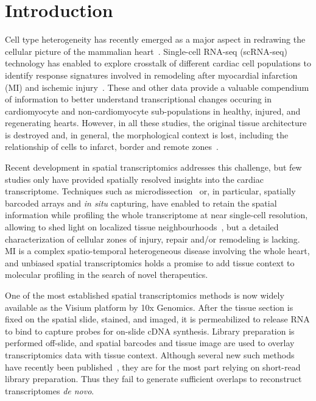 \documentclass[utf8]{FrontiersinHarvard} %
\newcommand{\insi}{\textit{in situ}\xspace}
\newcommand{\denovo}{\textit{de novo}\xspace}
\begin{document}
\section*{Introduction}
Cell type heterogeneity has recently emerged as a major aspect in redrawing the cellular picture of the mammalian heart~\citep{Wang2020:human_heart,Tucker2020:human_heart,Litvinukova2020:human_heart}. 
Single-cell RNA-seq (scRNA-seq) technology has enabled to explore crosstalk of different cardiac cell populations to identify response signatures involved in remodeling after myocardial infarction (MI) and ischemic injury~\citep{Cui2020:regenerative_cm,Forte2020:interstitial,Ruiz-Villalba2020:CF,Vafadarnejad2020:cardiac_neutrophil,Molenaar2021:ischemic,Gladka2021:CM_ZEB2,Tombor2021:endothelial_plasticity,Heinrichs2021:B-cell}.
These and other data provide a valuable compendium of information to better understand transcriptional changes occuring in cardiomyocyte and non-cardiomyocyte sub-populations in healthy, injured, and regenerating hearts.
However, in all these studies, the original tissue architecture is destroyed and, in general, the morphological context is lost, including the relationship of cells to infarct, border and remote zones~\citep{Duijvenboden2019:border_zone}.

Recent development in spatial transcriptomics addresses this challenge, but few studies only have provided spatially resolved insights into the cardiac transcriptome.
Techniques such as microdissection~\citep{Wu2016:zebrafish_cm,Burkhard2018:embryonic_heart} or, in particular, spatially barcoded arrays and \insi capturing, have enabled to retain the spatial information while profiling the whole transcriptome at near single-cell resolution, allowing to shed light on localized tissue neighbourhoods~\citep{Asp2017:fetal_markers,Asp2019:spatial_atlas_devel_heart}, but a detailed characterization of cellular zones of injury, repair and/or remodeling is lacking. MI is a complex spatio-temporal heterogeneous disease involving the whole heart, and unbiased spatial transcriptomics holds a promise to add tissue context to molecular profiling in the search of novel therapeutics.

One of the most established spatial transcriptomics methods is now widely available as the Visium platform by 10x Genomics. 
After the tissue section is fixed on the spatial slide, stained, and imaged, it is permeabilized to release RNA to bind to capture probes for on-slide cDNA synthesis.
Library preparation is performed off-slide, and spatial barcodes and tissue image are used to overlay transcriptomics data with tissue context.
Although several new such methods have recently been published~\citep{Rodriques2019:slide-seq,Liu2020:DBiT-seq}, they are for the most part relying on short-read library preparation.
Thus they fail to generate sufficient overlaps to reconstruct transcriptomes \denovo.
\end{document}
